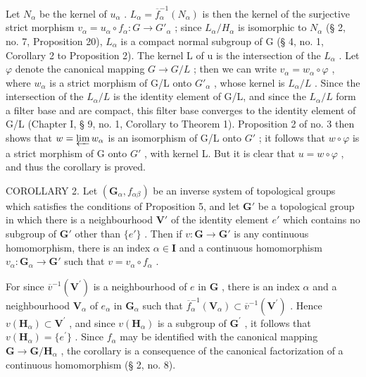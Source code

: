 Let \(N_{\alpha}\) be the kernel of \(u_{\alpha}\) . \(L_{\alpha} = \overline{f}_{\alpha}^{-1}(N_{\alpha})\) is then the kernel of the surjective strict morphism \(v_{\alpha} = u_{\alpha} \circ f_{\alpha}: G \to G'_{\alpha}\) ; since \(L_{\alpha}/H_{\alpha}\) is isomorphic to \(N_{\alpha}\) (§ 2, no. 7, Proposition 20), \(L_{\alpha}\) is a compact normal subgroup of G (§ 4, no. 1, Corollary 2 to Proposition 2). The kernel L of u is the intersection of the \(L_{\alpha}\) . Let \(\varphi\) denote the canonical mapping \(G \to G/L\) ; then we can write \(v_{\alpha} = w_{\alpha} \circ \varphi\) , where \(w_{\alpha}\) is a strict morphism of G/L onto \(G'_{\alpha}\) , whose kernel is \(L_{\alpha}/L\) . Since the intersection of the \(L_{\alpha}/L\) is the identity element of G/L, and since the \(L_{\alpha}/L\) form a filter base and are compact, this filter base converges to the identity element of G/L (Chapter I, § 9, no. 1, Corollary to Theorem 1). Proposition 2 of no. 3 then shows that \(w = \varprojlim w_{\alpha}\) is an isomorphism of G/L onto \(G'\) ; it follows that \(w \circ \varphi\) is a strict morphism of G onto \(G'\) , with kernel L. But it is clear that \(u = w \circ \varphi\) , and thus the corollary is proved.

COROLLARY 2. Let \((\mathbf{G}_{\alpha}, f_{\alpha \beta})\) be an inverse system of topological groups which satisfies the conditions of Proposition 5, and let \(\mathbf{G}'\) be a topological group in which there is a neighbourhood \(\mathbf{V}'\) of the identity element \(e'\) which contains no subgroup of \(\mathbf{G}'\) other than \(\{e'\}\) . Then if \(v: \mathbf{G} \to \mathbf{G}'\) is any continuous homomorphism, there is an index \(\alpha \in \mathbf{I}\) and a continuous homomorphism \(v_{\alpha}: \mathbf{G}_{\alpha} \to \mathbf{G}'\) such that \(v = v_{\alpha} \circ f_{\alpha}\) .

For since \(\overline{v}^{-1}(\mathbf{V}^{\prime})\) is a neighbourhood of \(e\) in \(\mathbf{G}\) , there is an index \(\alpha\) and a neighbourhood \(\mathbf{V}_{\alpha}\) of \(e_{\alpha}\) in \(\mathbf{G}_{\alpha}\) such that \(\overline{f}_{\alpha}^{-1}(\mathbf{V}_{\alpha}) \subset \overline{v}^{-1}(\mathbf{V}^{\prime})\) . Hence \(v(\mathbf{H}_{\alpha}) \subset \mathbf{V}^{\prime}\) , and since \(v(\mathbf{H}_{\alpha})\) is a subgroup of \(\mathbf{G}^{\prime}\) , it follows that \(v(\mathbf{H}_{\alpha}) = \{e^{\prime}\}\) . Since \(f_{\alpha}\) may be identified with the canonical mapping \(\mathbf{G} \to \mathbf{G}/\mathbf{H}_{\alpha}\) , the corollary is a consequence of the canonical factorization of a continuous homomorphism (§ 2, no. 8).

